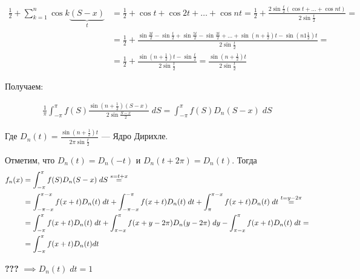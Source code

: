 \begin{example}
    \begin{align*}
        \frac{1}{2} + \sum_{k = 1}^n \cos k \underbrace{(S - x)}_t &=
        \frac{1}{2} + \cos t + \cos 2t + \dots + \cos nt = \frac{1}{2} +
        \frac{2 \sin \frac{t}{2} (\cos t + \dots + \cos nt)}{2 \sin \frac{t}{2}} = \\
        &= \frac{1}{2} + \frac{ 
            \sin \frac{3t}{2} - 
            \sin \frac{t}{2} + 
            \sin \frac{5t}{2} - 
            \sin \frac{3t}{2} + \dots +
            \sin \left(n + \frac{1}{2}\right)t -
            \sin \left(n 1 \frac{1}{2}\right)t }{2 \sin \frac{t}{2}} = \\
        &= \frac{1}{2} + \frac{\sin \left(n + \frac{1}{2}\right)t - \sin \frac{t}{2}}{2 \sin \frac{t}{2}} =
        \frac{\sin \left( n + \frac{1}{2} \right)t}{2 \sin \frac{t}{2}}
    \end{align*}

    Получаем:

    \begin{align*}
        \frac{1}{\pi} \int_{-\pi}^\pi f(S) \frac{\sin \left( n + \frac{1}{2} \right) (S - x)}{2 \sin \frac{S - x}{2}} \; dS =
        \int_{-\pi}^\pi f(S) D_n(S - x) \; dS
    \end{align*}

    Где $D_n(t) = \frac{\sin \left( n + \frac{1}{2} \right)t}{2 \pi \sin \frac{t}{2}}$ ---
    Ядро Дирихле.

    Отметим, что $D_n(t) = D_n(-t)$ и $D_n(t + 2\pi) = D_n(t)$. Тогда 
    \begin{align*}
        f_n(x) &= \int_{-\pi}^\pi f(S) D_n(S - x) \; dS \over{s = t + x}{=} \\
        &= \int_{-\pi - x}^{\pi - x} f(x + t) D_n(t) \; dt +
        \int_{-\pi - x}^{-\pi} f(x + t) D_n(t) \; dt +
        \int_{\pi}^{\pi - x} f(x + t) D_n(t) \; dt \over{t = y - 2\pi}{=} \\
        &= \int_{-\pi}^\pi f(x + t) D_n(t) \; dt +
        \int_{\pi - x}^\pi f(x + y - 2\pi) D_n(y - 2\pi) \; dy -
        \int_{\pi - x}^\pi f(x + t) D_n(t) \; dt = \\
        &= \int_{-\pi}^\pi f(x + t) D_n(t) dt
    \end{align*}

    \textbf{???} $\implies D_n(t) \; dt = 1$
\end{example}


